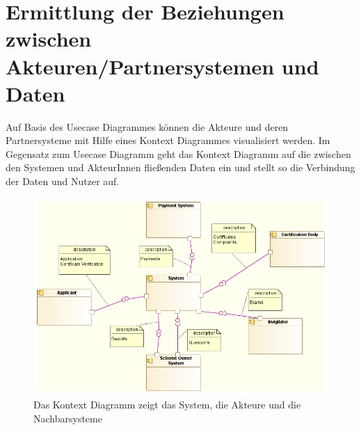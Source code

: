 \section{Ermittlung der Beziehungen zwischen Akteuren/Partnersystemen und Daten}
Auf Basis des Usecase Diagrammes können die Akteure und deren Partnersysteme mit Hilfe eines Kontext Diagrammes visualisiert werden. Im Gegensatz zum Usecase Diagramm geht das Kontext Diagramm auf die zwischen den Systemen und AkteurInnen fließenden Daten ein und stellt so die Verbindung der Daten und Nutzer auf.

\begin{figure}[H]
    \centering
    \includegraphics[scale=0.5]{uml/context.png}
    \caption{Das Kontext Diagramm zeigt das System, die Akteure und die Nachbarsysteme}
\end{figure}